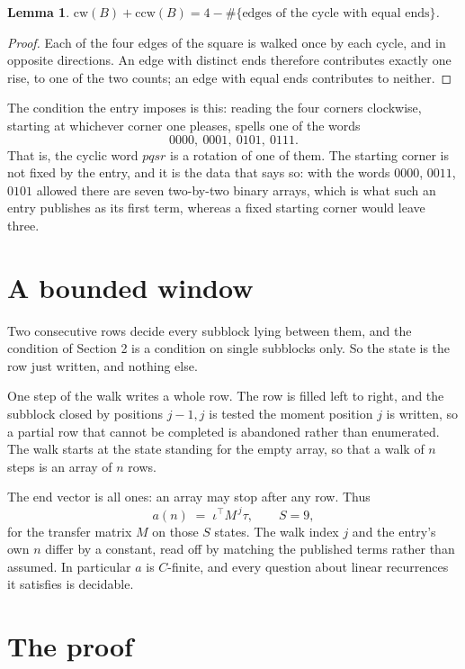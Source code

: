 \documentclass[11pt,a4paper]{article}
\theoremstyle{plain}
\newtheorem{lemma}[theorem]{Lemma}
\theoremstyle{definition}
\begin{document}
\begin{lemma}\label{lem:sum}
$\mathrm{cw}(B)+\mathrm{ccw}(B)=4-\#\{\text{edges of the cycle with equal ends}\}$.
\end{lemma}

\begin{proof}
Each of the four edges of the square is walked once by each cycle, and in opposite directions.
An edge with distinct ends therefore contributes exactly one rise, to one of the two counts;
an edge with equal ends contributes to neither.
\end{proof}

The condition the entry imposes is this: reading the four corners clockwise, starting at whichever corner one pleases, spells one of the words
\[
0000,\ 0001,\ 0101,\ 0111.
\]
That is, the cyclic word $pqsr$ is a rotation of one of them. The starting corner is not fixed by the entry, and it is the data that says so: with the words $0000$, $0011$, $0101$ allowed there are seven two-by-two binary arrays, which is what such an entry publishes as its first term, whereas a fixed starting corner would leave three.

\section{A bounded window}

Two consecutive rows decide every subblock lying between them, and the condition of Section 2 is a condition on single subblocks only. So the state is the row just written, and nothing else.

One step of the walk writes a whole row. The row is filled left to right, and the subblock
closed by positions $j-1,j$ is tested the moment position $j$ is written, so a partial row that
cannot be completed is abandoned rather than enumerated. The walk starts at the state standing
for the empty array, so that a walk of $n$ steps is an array of $n$ rows.

The end vector is all ones: an array may stop after any row. Thus
\[
a(n)\;=\;\iota^{\!\top}M^{\,j}\tau ,\qquad S=9,
\]
for the transfer matrix $M$ on those $S$ states. The walk index $j$ and the entry's own $n$
differ by a constant, read off by matching the published terms rather than assumed. In
particular $a$ is $C$-finite, and every question about linear recurrences it satisfies is
decidable.

\section{The proof}
\end{document}
